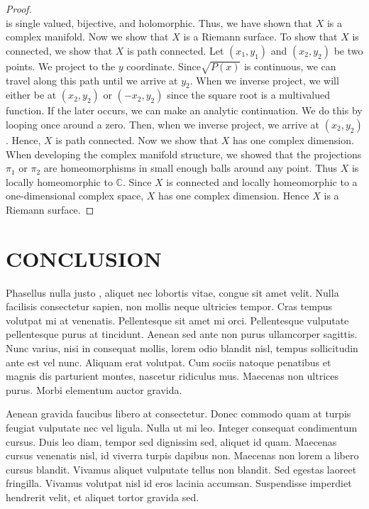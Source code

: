 \documentclass[12pt,oneside,final]{siuethesis}
\theoremstyle{definition}
\begin{document}
\begin{proof}
\begin{equation*}
\end{equation*}
is single valued, bijective, and holomorphic. Thus, we have shown that $X$ is a complex manifold. Now we show that $X$ is a Riemann surface. To show that $X$ is connected, we show that $X$ is path connected. Let $\left(x_{1},y_{1}\right) $ and $\left( x_{2},y_{2}\right) $ be two points. We project to the $y$ coordinate. Since$\sqrt{P\left( x\right) }$ is continuous, we can travel along this path until we arrive at $y_{2}$. When
we inverse project, we will either be at $\left( x_{2},y_{2}\right) $ or $\left( -x_{2},y_{2}\right)$ since the square root is a multivalued function. If the later occurs, we can make an analytic continuation. We do this by looping once around a zero. Then, when we inverse project, we arrive at $\left( x_{2},y_{2}\right)$. Hence, $X$ is path connected. Now we show that $X$ has one complex dimension. When developing the complex manifold structure, we showed that the projections $\pi _{1}$ or $\pi _{2}$ are homeomorphisms in small enough balls around any point. Thus $X$ is locally homeomorphic to $\mathbb{C}$. Since $X$ is connected and locally homeomorphic to a one-dimensional complex space, $X$ has one complex dimension. Hence $X$ is a Riemann surface.
\end{proof}


\chapter{CONCLUSION}


Phasellus nulla justo \cite{MR1415998}, aliquet nec lobortis vitae, congue sit amet velit. Nulla facilisis consectetur sapien, non mollis neque ultricies tempor. Cras tempus volutpat mi at venenatis. Pellentesque sit amet mi orci. Pellentesque vulputate pellentesque purus at tincidunt. Aenean sed ante non purus ullamcorper sagittis. Nunc varius, nisi in consequat mollis, lorem odio blandit nisl, tempus sollicitudin ante est vel nunc. Aliquam erat volutpat. Cum sociis natoque penatibus et magnis dis parturient montes, nascetur ridiculus mus. Maecenas non ultrices purus. Morbi elementum auctor gravida.

Aenean gravida faucibus libero at consectetur. Donec commodo quam at turpis feugiat vulputate nec vel ligula. Nulla ut mi leo. Integer consequat condimentum cursus. Duis leo diam, tempor sed dignissim sed, aliquet id quam. Maecenas cursus venenatis nisl, id viverra turpis dapibus non. Maecenas non lorem a libero cursus blandit. Vivamus aliquet vulputate tellus non blandit. Sed egestas laoreet fringilla. Vivamus volutpat nisl id eros lacinia accumsan. Suspendisse imperdiet hendrerit velit, et aliquet tortor gravida sed.
\end{document}
